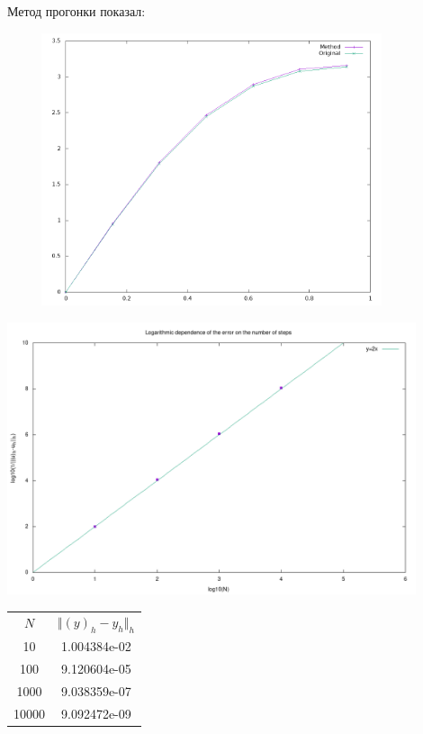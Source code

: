 \documentclass[12pt]{article}
\begin{document}
\begin{enumerate}[I.]
        Метод прогонки показал:
        \begin{center}
            \includegraphics[width=12cm, height=8cm]{tridiag_yn.png}
            
            \includegraphics[width=12cm, height=8cm]{tridiag_scale.png}
            
            \begin{tabular}{c c}
                $N$   & $\Vert(y)_h-y_h\Vert_h$ \\
                10    & 1.004384e-02 \\
                100   & 9.120604e-05 \\
                1000  & 9.038359e-07 \\
                10000 & 9.092472e-09 \\
            \end{tabular}
        \end{center}

    \end{enumerate}
\end{document}
